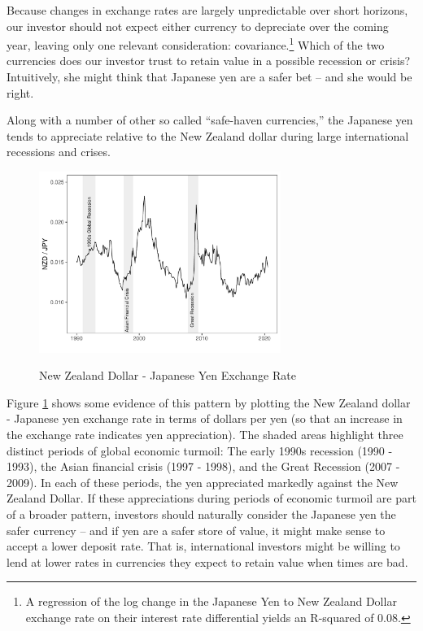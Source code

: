 \documentclass{ar-1col}
\begin{document}
Because changes in exchange rates are largely unpredictable over short horizons, our investor should not expect either currency to depreciate over the coming year, leaving only one relevant consideration: covariance.\footnote{A regression of the log change in the Japanese Yen to New Zealand Dollar exchange rate on their interest rate differential yields an R-squared of 0.08.} Which of the two currencies does our investor trust to retain value in a possible recession or crisis? Intuitively, she might think that Japanese yen are a safer bet -- and she would be right.

Along with a number of other so called ``safe-haven currencies,'' the Japanese yen tends to appreciate relative to the New Zealand dollar during large international recessions and crises.
\begin{figure}[htp!]
  \centering
  \caption{New Zealand Dollar - Japanese Yen Exchange Rate}
  \includegraphics[width=0.7\textwidth]{Exhibits/Figure_FX_JPYNZD.pdf}
  \label{fig:spot}
\end{figure}
Figure \ref{fig:spot} shows some evidence of this pattern by plotting the New Zealand dollar - Japanese yen exchange rate in terms of dollars per yen (so that an increase in the exchange rate indicates yen appreciation). The shaded areas highlight three distinct periods of global economic turmoil: The early 1990s recession (1990 - 1993), the Asian financial crisis (1997 - 1998), and the Great Recession (2007 - 2009). In each of these periods, the yen appreciated markedly against the New Zealand Dollar. If these appreciations during periods of economic turmoil are part of a broader pattern, investors should naturally consider the Japanese yen the safer currency -- and if yen are a safer store of value, it might make sense to accept a lower deposit rate. That is, international investors might be willing to lend at lower rates in currencies they expect to retain value when times are bad.
\end{document}
